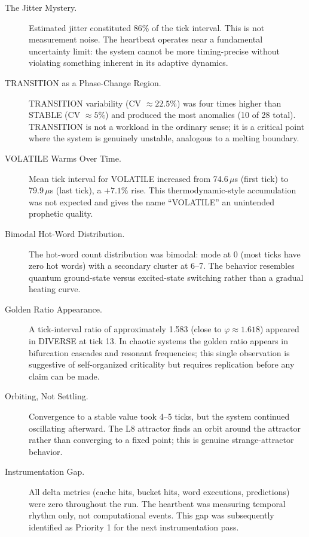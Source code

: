 \begin{description}
  \item[The Jitter Mystery.]
        Estimated jitter constituted 86\% of the tick interval. This is not
        measurement noise. The heartbeat operates near a fundamental
        uncertainty limit: the system cannot be more timing-precise without
        violating something inherent in its adaptive dynamics.

  \item[TRANSITION as a Phase-Change Region.]
        TRANSITION variability (CV $\approx 22.5\%$) was four times higher
        than STABLE (CV $\approx 5\%$) and produced the most anomalies
        (10 of 28 total). TRANSITION is not a workload in the ordinary
        sense; it is a critical point where the system is genuinely
        unstable, analogous to a melting boundary.

  \item[VOLATILE Warms Over Time.]
        Mean tick interval for VOLATILE increased from 74.6\,$\mu$s (first
        tick) to 79.9\,$\mu$s (last tick), a $+7.1\%$ rise. This
        thermodynamic-style accumulation was not expected and gives the name
        ``VOLATILE'' an unintended prophetic quality.

  \item[Bimodal Hot-Word Distribution.]
        The hot-word count distribution was bimodal: mode at 0 (most
        ticks have zero hot words) with a secondary cluster at 6--7.
        The behavior resembles quantum ground-state versus excited-state
        switching rather than a gradual heating curve.

  \item[Golden Ratio Appearance.]
        A tick-interval ratio of approximately 1.583 (close to
        $\varphi \approx 1.618$) appeared in DIVERSE at tick 13.
        In chaotic systems the golden ratio appears in bifurcation
        cascades and resonant frequencies; this single observation
        is suggestive of self-organized criticality but requires
        replication before any claim can be made.

  \item[Orbiting, Not Settling.]
        Convergence to a stable value took 4--5 ticks, but the system
        continued oscillating afterward. The L8 attractor finds an orbit
        around the attractor rather than converging to a fixed point;
        this is genuine strange-attractor behavior.

  \item[Instrumentation Gap.]
        All delta metrics (cache hits, bucket hits, word executions,
        predictions) were zero throughout the run. The heartbeat was
        measuring temporal rhythm only, not computational events.
        This gap was subsequently identified as Priority 1 for the
        next instrumentation pass.


\end{description}
